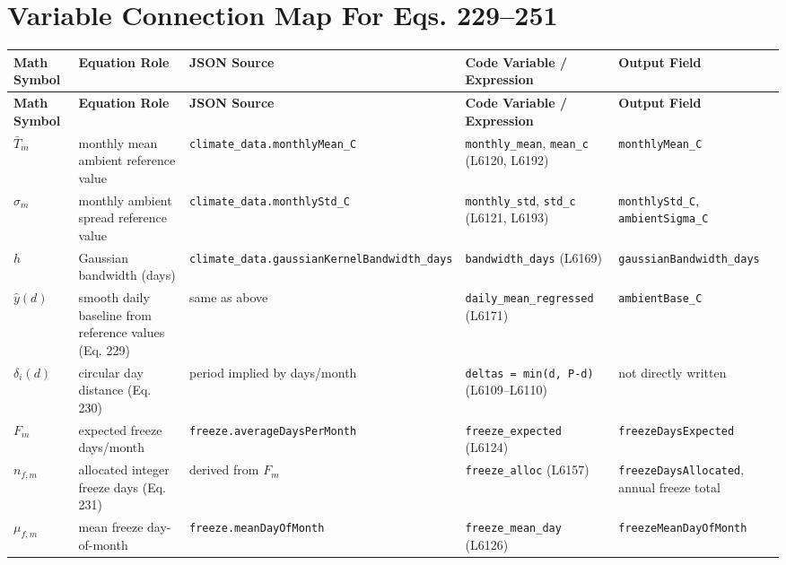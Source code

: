 \documentclass[11pt]{article}
\begin{document}
\section{Variable Connection Map For Eqs. 229--251}
\small
\begin{longtable}{p{}p{}p{}p{}p{}}
\toprule
\textbf{Math Symbol} & \textbf{Equation Role} & \textbf{JSON Source} & \textbf{Code Variable / Expression} & \textbf{Output Field} \\
\midrule
\endfirsthead
\toprule
\textbf{Math Symbol} & \textbf{Equation Role} & \textbf{JSON Source} & \textbf{Code Variable / Expression} & \textbf{Output Field} \\
\midrule
\endhead

$\bar T_m$ & monthly mean ambient reference value & \texttt{climate\_data.monthlyMean\_C} & \texttt{monthly\_mean}, \texttt{mean\_c} (L6120, L6192) & \texttt{monthlyMean\_C} \\

$\sigma_m$ & monthly ambient spread reference value & \texttt{climate\_data.monthlyStd\_C} & \texttt{monthly\_std}, \texttt{std\_c} (L6121, L6193) & \texttt{monthlyStd\_C}, \texttt{ambientSigma\_C} \\

$h$ & Gaussian bandwidth (days) & \texttt{climate\_data.gaussianKernelBandwidth\_days} & \texttt{bandwidth\_days} (L6169) & \texttt{gaussianBandwidth\_days} \\

$\hat y(d)$ & smooth daily baseline from reference values (Eq. 229) & same as above & \texttt{daily\_mean\_regressed} (L6171) & \texttt{ambientBase\_C} \\

$\delta_i(d)$ & circular day distance (Eq. 230) & period implied by days/month & \texttt{deltas = min(d, P-d)} (L6109--L6110) & not directly written \\

$F_m$ & expected freeze days/month & \texttt{freeze.averageDaysPerMonth} & \texttt{freeze\_expected} (L6124) & \texttt{freezeDaysExpected} \\

$n_{f,m}$ & allocated integer freeze days (Eq. 231) & derived from $F_m$ & \texttt{freeze\_alloc} (L6157) & \texttt{freezeDaysAllocated}, annual freeze total \\

$\mu_{f,m}$ & mean freeze day-of-month & \texttt{freeze.meanDayOfMonth} & \texttt{freeze\_mean\_day} (L6126) & \texttt{freezeMeanDayOfMonth} \\


\end{longtable}
\end{document}
